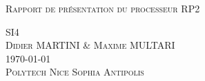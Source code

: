 ﻿%


\begin{titlepage}

\begin{center}

\Large
\textsc{Rapport de présentation du processeur RP2}\\

\vspace{5cm}

\textsc{SI4\\[0.5\baselineskip]
Didier MARTINI \& Maxime MULTARI 
}\\

\vspace{5cm}
\textsc{\today}\\ %

\vspace{1cm}
\textsc{Polytech Nice Sophia Antipolis}\\

\end{center}

\end{titlepage}

